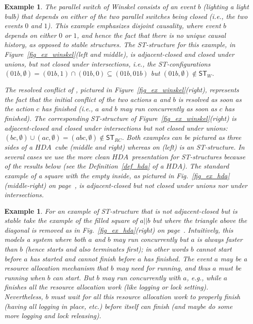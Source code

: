 \documentclass[submission,copyright,creativecommons]{eptcs}
\newtheorem{example}[theorem]{Example}
\newcounter{case}
\newcommand\HDA{\ensuremath{\mathit{HDA}}}
\newcommand\ST{\ensuremath{\mathsf{ST}}}
\begin{document}
\begin{example}\label{ex_Winskel_switch_resolved_conflict}
The parallel switch of Winskel \cite[Ex.1.1.7]{Winskel86} consists of an event $b$ (lighting a light bulb) that depends on either of the two parallel switches being closed (i.e., the two events $0$ and $1$). This example emphasizes \textit{disjoint causality}, where event $b$ depends on either $0$ or $1$, and hence the fact that there is no \textit{unique causal history}, as opposed to \textit{stable structures}.
The ST-structure for this example, in Figure~\ref{fig_ex_winskel}(left and middle), is adjacent-closed and closed under unions, but not closed under intersections, i.e., the ST-configurations $(01b,\emptyset)\!=\!(01b,1)\cap(01b,0)\!\subseteq\!(01b,01b)$ but $(01b,\emptyset)\not\in \ST_{W}$. 

The resolved conflict of \cite[Ex.2]{GlabbeekP09configStruct}, pictured in Figure~\ref{fig_ex_winskel}(right), represents the fact that the initial conflict of the two actions $a$ and $b$ is resolved as soon as the action $c$ has finished (i.e., $a$ and $b$ may run concurrently as soon as $c$ has finished). The corresponding ST-structure of Figure~\ref{fig_ex_winskel}(right) is adjacent-closed and closed under intersections but not closed under unions:  $(bc,\emptyset)\cup(ac,\emptyset)=(abc,\emptyset)\not\in \ST_{RC}$.
Both examples can be pictured as three sides of a \HDA\ cube (middle and right) whereas on (left) is an ST-structure. In several cases we use the more clean \HDA\ presentation for ST-structures because of the results below (see the Definition~\ref{def_hda} of a \HDA).
The standard example of a square with the empty inside, as pictured in Fig.~\ref{fig_ex_hda}(middle-right) on page~\pageref{fig_ex_hda}, is adjacent-closed but not closed under unions nor under intersections.
\end{example}


\begin{example}\label{ex_not_adjacent_stable}
For an example of ST-structure that is not adjacent-closed but is stable take the example of the filled square of $a||b$ but where the triangle above the diagonal is removed as in Fig.~\ref{fig_ex_hda}(right) on page~\pageref{fig_ex_hda}. Intuitively, this models a system where both $a$ and $b$ may run concurrently but $a$ is always faster than $b$ (hence starts and also terminates first); in other words $b$ cannot start before $a$ has started and cannot finish before $a$ has finished. 
The event $a$ may be a resource allocation mechanism that $b$ may need for running, and thus $a$ must be running when $b$ can start. But $b$ may run concurrently with $a$, e.g., while $a$ finishes all the resource allocation work (like logging or lock setting). Nevertheless, $b$ must wait for all this resource allocation work to properly finish (having all logging in place, etc.) before itself can finish (and maybe do some more logging and lock releasing).
\end{example}
\end{document}
